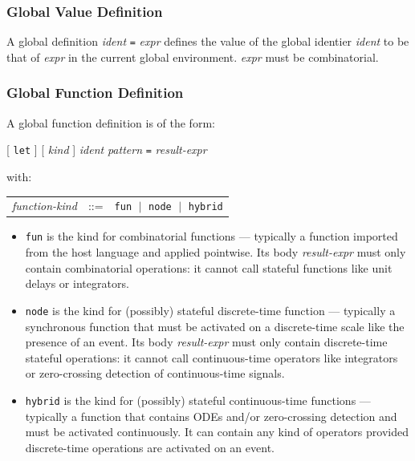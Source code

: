\documentclass[11pt,titlepage,twoside]{report}
\newcommand{\alt}{\;|\;}
\newcommand{\term}[1]{{\tt #1}}
\newcommand{\nterm}[1]{{\em #1}}
\begin{document}
\subsubsection{Global Value Definition}
A global definition \nterm{ident} \term{=} \nterm{expr} defines the value
of the global identier \nterm{ident} to be that of \nterm{expr} in the
current global environment. \nterm{expr} must be combinatorial.

\subsubsection{Global Function Definition}
A global function definition is of the form:
\begin{center}
  [ \term{let} ] [ \nterm{kind} ] \nterm{ident} \nterm{pattern} \term{=}
                    \nterm{result-expr}
\end{center}
with:
\begin{center}
  \begin{tabular}{lcl}
    \nterm{function-kind} & ::=  & \term{fun} $\alt$ \term{node}
                                              $\alt$ \term{hybrid}
\end{tabular}
\end{center}

\begin{itemize}
\item
  \term{fun} is the kind for combinatorial functions --- typically a
  function imported from the host language and applied pointwise. Its
  body \nterm{result-expr} must only contain combinatorial operations:
  it cannot call stateful functions like unit delays or integrators.
\item
  \term{node} is the kind for (possibly) stateful discrete-time
  function --- typically a synchronous function that must be activated
  on a discrete-time scale like the presence of an event. Its body
  \nterm{result-expr} must only contain discrete-time stateful
  operations: it cannot call continuous-time operators like
  integrators or zero-crossing detection of continuous-time signals.
\item
  \term{hybrid} is the kind for (possibly) stateful continuous-time
  functions --- typically a function that contains ODEs and/or
  zero-crossing detection and must be activated continuously. It can
  contain any kind of operators provided discrete-time operations are activated
  on an event.
\end{itemize}
\end{document}
